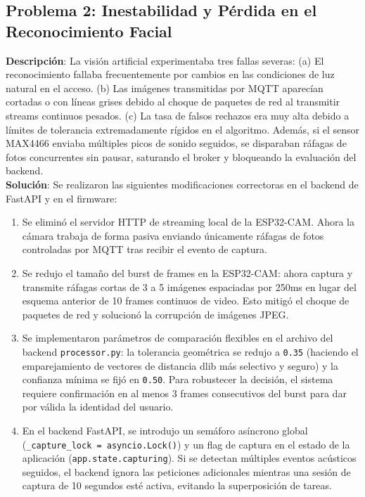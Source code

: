 \documentclass[12pt,letterpaper]{article}
\begin{document}
\subsection{Problema 2: Inestabilidad y Pérdida en el Reconocimiento Facial}
\textbf{Descripción}: La visión artificial experimentaba tres fallas severas: (a) El reconocimiento fallaba frecuentemente por cambios en las condiciones de luz natural en el acceso. (b) Las imágenes transmitidas por MQTT aparecían cortadas o con líneas grises debido al choque de paquetes de red al transmitir streams continuos pesados. (c) La tasa de falsos rechazos era muy alta debido a límites de tolerancia extremadamente rígidos en el algoritmo. Además, si el sensor MAX4466 enviaba múltiples picos de sonido seguidos, se disparaban ráfagas de fotos concurrentes sin pausar, saturando el broker y bloqueando la evaluación del backend. \\
\textbf{Solución}: Se realizaron las siguientes modificaciones correctoras en el backend de FastAPI y en el firmware:
\begin{enumerate}
    \item Se eliminó el servidor HTTP de streaming local de la ESP32-CAM. Ahora la cámara trabaja de forma pasiva enviando únicamente ráfagas de fotos controladas por MQTT tras recibir el evento de captura.
    \item Se redujo el tamaño del burst de frames en la ESP32-CAM: ahora captura y transmite ráfagas cortas de 3 a 5 imágenes espaciadas por 250ms en lugar del esquema anterior de 10 frames continuos de video. Esto mitigó el choque de paquetes de red y solucionó la corrupción de imágenes JPEG.
    \item Se implementaron parámetros de comparación flexibles en el archivo del backend \texttt{processor.py}: la tolerancia geométrica se redujo a \texttt{0.35} (haciendo el emparejamiento de vectores de distancia dlib más selectivo y seguro) y la confianza mínima se fijó en \texttt{0.50}. Para robustecer la decisión, el sistema requiere confirmación en al menos 3 frames consecutivos del burst para dar por válida la identidad del usuario.
    \item En el backend FastAPI, se introdujo un semáforo asíncrono global (\texttt{\_capture\_lock = asyncio.Lock()}) y un flag de captura en el estado de la aplicación (\texttt{app.state.capturing}). Si se detectan múltiples eventos acústicos seguidos, el backend ignora las peticiones adicionales mientras una sesión de captura de 10 segundos esté activa, evitando la superposición de tareas.
\end{enumerate}
\end{document}
